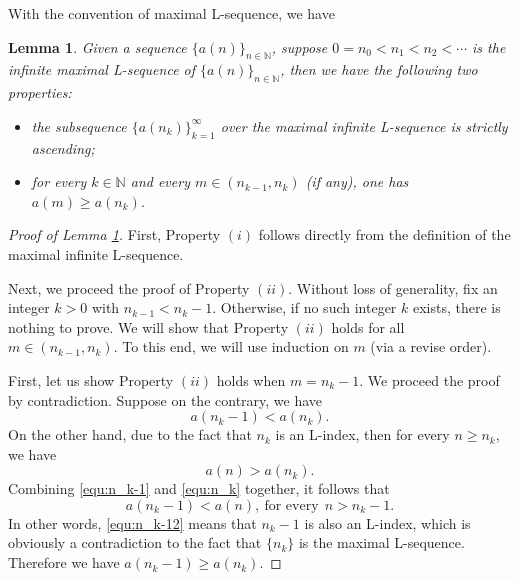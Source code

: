 \documentclass[12pt,reqno]{amsart}
\renewcommand{\=}{\coloneqq}
\theoremstyle{plain}
\newtheorem{lemma}[theorem]{Lemma}
\begin{document}
With the convention of maximal L-sequence, we have
\begin{lemma}\label{lem-2}
Given a sequence $\{a(n)\}_{n\in\mathbb{N}}$, suppose $0=n_0 < n_1 < n_2 < \cdots$ is the infinite maximal L-sequence of $\{a(n)\}_{n\in\mathbb{N}}$, then we have the following two properties:
\begin{itemize}
\item[(i).] the subsequence $\{a(n_k)\}_{k=1}^\infty$ over the maximal infinite L-sequence is strictly ascending;
\item[(ii).] for every $k\in\mathbb{N}$ and every $m\in (n_{k-1}, n_k)$ (if any), one has $a(m) \geq a(n_k)$.
\end{itemize}
\end{lemma}
\begin{proof}[Proof of Lemma \ref{lem-2}]
First, Property $(i)$ follows directly from the definition of the maximal infinite L-sequence.

Next, we proceed the proof of Property $(ii)$. Without loss of generality, fix an integer $k>0$ with $n_{k-1}<n_{k}-1$. Otherwise, if no such integer $k$ exists, there is nothing to prove. We will show that Property $(ii)$ holds for all $m\in (n_{k-1}, n_k)$. To this end, we will use induction on $m$ (via a revise order).

First, let us show Property $(ii)$ holds when $m=n_{k}-1$. We proceed the proof by contradiction. Suppose on the contrary, we have
\begin{equation}\label{equ:n_k-1}
a(n_{k}-1)<a(n_{k}).
\end{equation}
On the other hand, due to the fact that $n_{k}$ is an L-index, then for every $n\geq n_{k}$, we have
\begin{equation}\label{equ:n_k}
a(n)>a(n_{k}).
\end{equation}
Combining \eqref{equ:n_k-1} and \eqref{equ:n_k} together, it follows that
\begin{equation}\label{equ:n_k-12}
a(n_{k}-1)<a(n),~\mbox{for every}~~n>n_{k}-1.
\end{equation}
In other words, \eqref{equ:n_k-12} means that $n_{k}-1$ is also an L-index, which is obviously a contradiction to the fact that $\{n_{k}\}$ is the maximal L-sequence. Therefore we have $a(n_{k}-1)\geq a(n_{k})$.


\end{proof}
\end{document}
